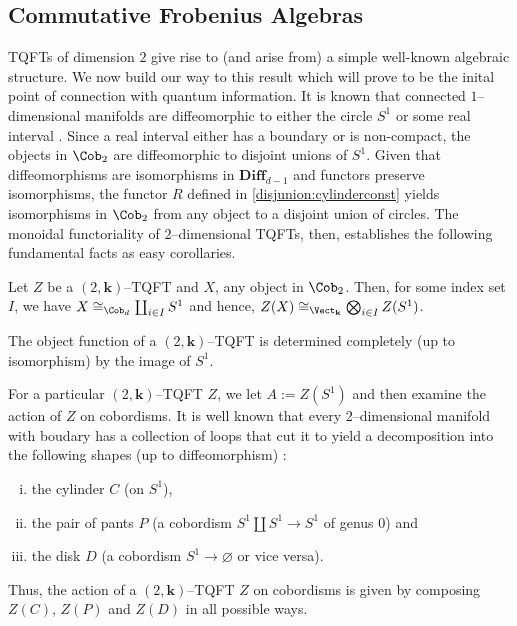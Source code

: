 
\subsection{Commutative Frobenius Algebras}\label{sec:frob}

TQFTs of dimension $2$ give rise to (and arise from) a simple well-known
algebraic structure. We now build our way to this result which will prove to be
the inital point of connection with quantum information. It is known that
connected $1$--dimensional manifolds are diffeomorphic to either the circle
$S^1$ or some real interval \cite{MilnorDiff}. Since a real interval either has
a boundary or is non-compact, the objects in $\Cob_2$ are diffeomorphic to
disjoint unions of $S^1$. Given that diffeomorphisms are isomorphisms in
$\textbf{Diff}_{d - 1}$ and functors preserve isomorphisms, the functor $R$
defined in \ref{disjunion:cylinderconst} yields isomorphisms in $\Cob_2$ from
any object to a disjoint union of circles. The monoidal functoriality of
$2$--dimensional TQFTs, then, establishes the following fundamental facts as
easy corollaries.

\begin{cor}
Let $Z$ be a $(2, \mathbf{k})$--TQFT and $X$, any object in $\Cob_2$. Then, for
some index set $I$, we have $X \cong_{\Cob_d} \coprod_{i \in I} S^1$ and hence,
$Z(X) \cong_{\Vect_{\mathbf{k}}} \bigotimes_{i \in I}Z(S^1)$.
\end{cor}

\begin{cor}
The object function of a $(2, \mathbf{k})$--TQFT is determined completely (up to
isomorphism) by the image of $S^1$.
\end{cor}

For a particular $(2, \mathbf{k})$--TQFT $Z$, we let $A := Z(S^1)$ and then
examine the action of $Z$ on cobordisms. It is well known that every
$2$--dimensional manifold with boudary has a collection of loops that cut it to
yield a decomposition into the following shapes (up to diffeomorphism)
\cite{Atiyah2}:
\begin{enumerate}[(i)]
  \item the cylinder $C$ (on $S^1$),
  \item the pair of pants $P$ (a cobordism $S^1 \amalg S^1 \to S^1$ of genus
  $0$) and
  \item the disk $D$ (a cobordism $S^1 \to \varnothing$ or vice versa).
\end{enumerate}
Thus, the action of a $(2, \mathbf{k})$--TQFT $Z$ on cobordisms is given by
composing $Z(C)$, $Z(P)$ and $Z(D)$ in all possible ways.

